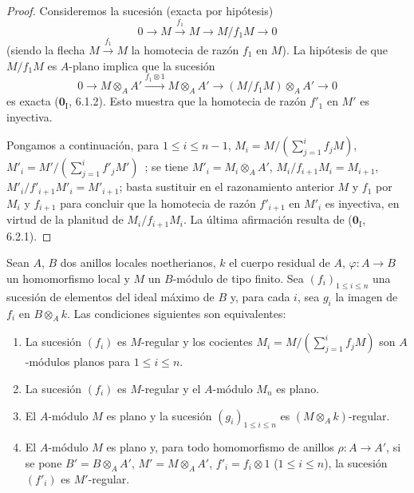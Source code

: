 \begin{proof}
Consideremos la sucesión (exacta por hipótesis)
\[
  0\longrightarrow M\xrightarrow{f_1}M\longrightarrow M/f_1M
  \longrightarrow0
\]
(siendo la flecha $M\xrightarrow{f_1}M$ la homotecia de razón $f_1$ en
$M$). La hipótesis de que $M/f_1M$ es $A$-plano implica que la sucesión
\[
  0\longrightarrow M\otimes_A A'
  \xrightarrow{f_1\otimes1}M\otimes_A A'
  \longrightarrow(M/f_1M)\otimes_A A'\longrightarrow0
\]
es exacta ($\mathbf{0}_{\mathrm I}$, 6.1.2). Esto muestra que la homotecia de razón
$f'_1$ en $M'$ es inyectiva.

Pongamos a continuación, para $1\leq i\leq n-1$,
$M_i=M/(\sum_{j=1}^i f_jM)$, $M'_i=M'/(\sum_{j=1}^i f'_jM')$~;
se tiene $M'_i=M_i\otimes_A A'$, $M_i/f_{i+1}M_i=M_{i+1}$,
$M'_i/f'_{i+1}M'_i=M'_{i+1}$; basta sustituir en el razonamiento anterior
$M$ y $f_1$ por $M_i$ y $f_{i+1}$ para concluir que la homotecia de razón
$f'_{i+1}$ en $M'_i$ es inyectiva, en virtud de la planitud de
$M_i/f_{i+1}M_i$. La última afirmación resulta de ($\mathbf{0}_{\mathrm I}$, 6.2.1).
\end{proof}
\begin{proposition}[15.1.16]
\label{0.15.1.16-fr}
Sean $A$, $B$ dos anillos locales noetherianos, $k$ el cuerpo residual de
$A$, $\varphi:A\to B$ un homomorfismo local y $M$ un $B$-módulo de tipo finito.
Sea $(f_i)_{1\leq i\leq n}$ una sucesión de elementos del ideal máximo de $B$
y, para cada $i$, sea $g_i$ la imagen de $f_i$ en $B\otimes_A k$. Las
condiciones siguientes son equivalentes:
\begin{enumerate}
  \item[\textup{a)}] La sucesión $(f_i)$ es $M$-regular y los cocientes
  $M_i=M/(\sum_{j=1}^i f_jM)$
  son $A$-módulos planos para $1\leq i\leq n$.
  \item[\textup{b)}] La sucesión $(f_i)$ es $M$-regular y el $A$-módulo $M_n$ es
  plano.
  \item[\textup{c)}] El $A$-módulo $M$ es plano y la sucesión
  $(g_i)_{1\leq i\leq n}$ es $(M\otimes_A k)$-regular.
  \item[\textup{d)}] El $A$-módulo $M$ es plano y, para todo homomorfismo de
  anillos $\rho:A\to A'$, si se pone $B'=B\otimes_A A'$,
  $M'=M\otimes_A A'$, $f'_i=f_i\otimes1$ \textup{($1\leq i\leq n$)}, la sucesión
  $(f'_i)$ es $M'$-regular.
\end{enumerate}
\end{proposition}

